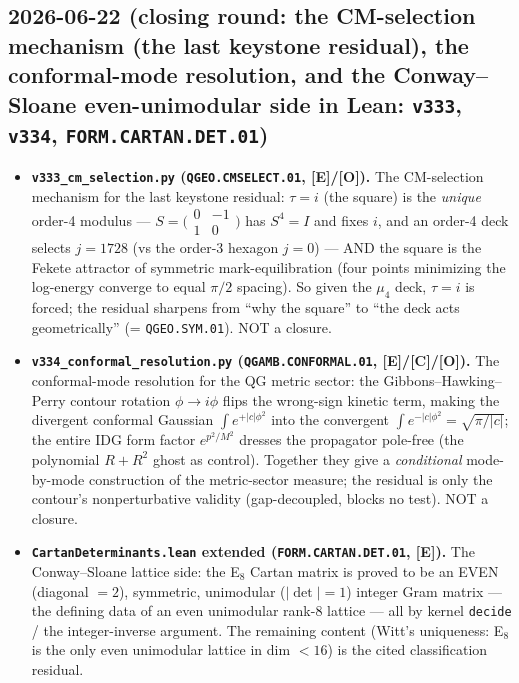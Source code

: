 \documentclass[11pt]{article}
\providecommand{\mE}{\textbf{[E]}}\providecommand{\mC}{\textbf{[C]}}
\providecommand{\mO}{\textbf{[O]}}\providecommand{\mX}{\textbf{[X]}}
\begin{document}
\subsection*{2026-06-22 (closing round: the CM-selection mechanism (the last keystone residual), the conformal-mode resolution, and the Conway--Sloane even-unimodular side in Lean: \texttt{v333}, \texttt{v334}, \texttt{FORM.CARTAN.DET.01})}
\begin{itemize}
\item \textbf{\texttt{v333\_cm\_selection.py} (\texttt{QGEO.CMSELECT.01}, \mE/\mO).} The CM-selection mechanism for
  the last keystone residual: $\tau{=}i$ (the square) is the \emph{unique} order-4 modulus --- $S{=}\bigl(\begin{smallmatrix}0&-1\\1&0\end{smallmatrix}\bigr)$ has $S^4{=}I$ and fixes $i$, and an order-4 deck selects
  $j{=}1728$ (vs the order-3 hexagon $j{=}0$) --- AND the square is the Fekete attractor of symmetric
  mark-equilibration (four points minimizing the log-energy converge to equal $\pi/2$ spacing).  So given the
  $\mu_4$ deck, $\tau{=}i$ is forced; the residual sharpens from ``why the square'' to ``the deck acts
  geometrically'' (= \texttt{QGEO.SYM.01}).  NOT a closure.
\item \textbf{\texttt{v334\_conformal\_resolution.py} (\texttt{QGAMB.CONFORMAL.01}, \mE/\mC/\mO).} The
  conformal-mode resolution for the QG metric sector: the Gibbons--Hawking--Perry contour rotation $\phi\to i\phi$
  flips the wrong-sign kinetic term, making the divergent conformal Gaussian $\int e^{+|c|\phi^2}$ into the
  convergent $\int e^{-|c|\phi^2}{=}\sqrt{\pi/|c|}$; the entire IDG form factor $e^{p^2/M^2}$ dresses the
  propagator pole-free (the polynomial $R{+}R^2$ ghost as control).  Together they give a \emph{conditional}
  mode-by-mode construction of the metric-sector measure; the residual is only the contour's nonperturbative
  validity (gap-decoupled, blocks no test).  NOT a closure.
\item \textbf{\texttt{CartanDeterminants.lean} extended (\texttt{FORM.CARTAN.DET.01}, \mE).} The Conway--Sloane
  lattice side: the E$_8$ Cartan matrix is proved to be an EVEN (diagonal $=2$), symmetric, unimodular
  ($|\det|{=}1$) integer Gram matrix --- the defining data of an even unimodular rank-8 lattice --- all by kernel
  \texttt{decide} / the integer-inverse argument.  The remaining content (Witt's uniqueness: E$_8$ is the only even
  unimodular lattice in dim $<16$) is the cited classification residual.
\end{itemize}
\end{document}
